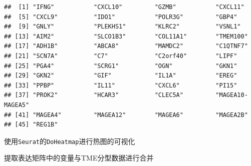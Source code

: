 \documentclass[
  12pt,
]{book}
\newenvironment{Shaded}{\begin{snugshade}}{\end{snugshade}}
\newcommand{\AttributeTok}[1]{\textcolor[rgb]{0.13,0.29,0.53}{#1}}
\newcommand{\CommentTok}[1]{\textcolor[rgb]{0.56,0.35,0.01}{\textit{#1}}}
\newcommand{\ConstantTok}[1]{\textcolor[rgb]{0.56,0.35,0.01}{#1}}
\newcommand{\DecValTok}[1]{\textcolor[rgb]{0.00,0.00,0.81}{#1}}
\newcommand{\FunctionTok}[1]{\textcolor[rgb]{0.13,0.29,0.53}{\textbf{#1}}}
\newcommand{\NormalTok}[1]{#1}
\newcommand{\OtherTok}[1]{\textcolor[rgb]{0.56,0.35,0.01}{#1}}
\newcommand{\SpecialCharTok}[1]{\textcolor[rgb]{0.81,0.36,0.00}{\textbf{#1}}}
\newcommand{\StringTok}[1]{\textcolor[rgb]{0.31,0.60,0.02}{#1}}
\begin{document}
\begin{verbatim}
##  [1] "IFNG"           "CXCL10"         "GZMB"           "CXCL11"        
##  [5] "CXCL9"          "IDO1"           "POLR3G"         "GBP4"          
##  [9] "GNLY"           "PLEKHS1"        "KLRC2"          "VSNL1"         
## [13] "AIM2"           "SLCO1B3"        "COL11A1"        "TMEM100"       
## [17] "ADH1B"          "ABCA8"          "MAMDC2"         "C1QTNF7"       
## [21] "SCN7A"          "C7"             "C2orf40"        "LIPF"          
## [25] "PGA4"           "SCRG1"          "OGN"            "GKN1"          
## [29] "GKN2"           "GIF"            "IL1A"           "EREG"          
## [33] "PPBP"           "IL11"           "CXCL6"          "PI15"          
## [37] "PROK2"          "HCAR3"          "CLEC5A"         "MAGEA10-MAGEA5"
## [41] "MAGEA4"         "MAGEA12"        "MAGEA6"         "MAGEA2B"       
## [45] "REG1B"
\end{verbatim}

使用\texttt{Seurat}的\texttt{DoHeatmap}进行热图的可视化

\begin{Shaded}
\end{Shaded}

提取表达矩阵中的变量与TME分型数据进行合并

\begin{Shaded}
\end{Shaded}
\end{document}

